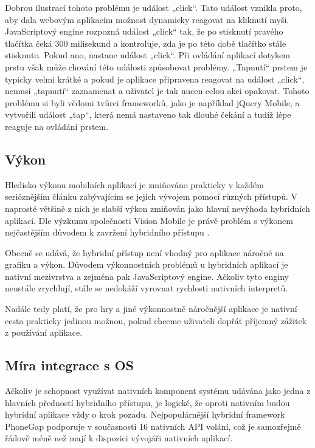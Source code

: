 Dobrou ilustrací tohoto problému je událost „click“. Tato událost vznikla proto, aby dala webovým aplikacím možnost dynamicky reagovat na kliknutí myši. JavaScriptový engine rozpozná událost „click“ tak, že po stisknutí pravého tlačítka čeká 300 milisekund a kontroluje, zda je po této době tlačítko stále stisknuto. Pokud ano, nastane událost „click“. Při ovládání aplikací dotykem prstu však může chování této události způsobovat problémy. „Tapnutí“ prstem je typicky velmi krátké a pokud je aplikace připravena reagovat na událost „click“, nemusí „tapnutí“ zaznamenat a uživatel je tak nucen celou akci opakovat. Tohoto problému si byli vědomi tvůrci frameworků, jako je například jQuery Mobile, a vytvořili událost „tap“, která nemá nastaveno tak dlouhé čekání a tudíž lépe reaguje na ovládání prstem.

\subsection{Výkon}
Hledisko výkonu mobilních aplikací je zmiňováno prakticky v každém serióznějším článku zabývajícím se jejich vývojem pomocí různých přístupů. V naprosté většině z nich je slabší výkon zmiňován jako hlavní nevýhoda hybridních aplikací. Dle výzkumu společnosti Vision Mobile je právě problém s výkonem nejčastějším důvodem k zavržení hybridního přístupu \cite{visionmobile_survey}.

Obecně se udává, že hybridní přístup není vhodný pro aplikace náročné na grafiku a výkon. Důvodem výkonnostních problémů u hybridních aplikací je nativní mezivrstva a zejména pak JavaScriptový engine. Ačkoliv tyto enginy neustále zrychlují, stále se nedokáží vyrovnat rychlosti nativních interpretů.

Nadále tedy platí, že pro hry a jiné výkonnostně náročnější aplikace je nativní cesta prakticky jedinou možnou, pokud chceme uživateli dopřát příjemný zážitek z používání aplikace.

\subsection{Míra integrace s OS}
Ačkoliv je schopnost využívat nativních komponent systému udávána jako jedna z hlavních předností hybridního přístupu, je logické, že oproti nativním budou hybridní aplikace vždy o krok pozadu. Nejpopulárnější hybridní framework PhoneGap podporuje v současnosti 16 nativních API volání, což je samozřejmě řádově méně než mají k dispozici vývojáři nativních aplikací.

